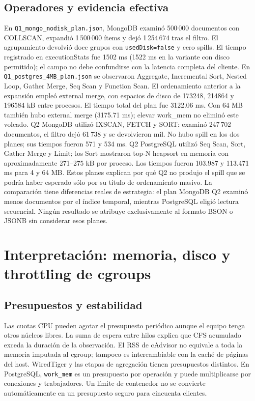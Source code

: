 \documentclass[11pt,letterpaper]{article}
\begin{document}
\subsection{Operadores y evidencia efectiva}
En \texttt{Q1\_mongo\_nodisk\_plan.json}, MongoDB examinó 500\,000 documentos con COLLSCAN, expandió 1\,500\,000 ítems y dejó 1\,254\,674 tras el filtro. El agrupamiento devolvió doce grupos con \texttt{usedDisk=false} y cero spills. El tiempo registrado en executionStats fue 1502 ms (1522 ms en la variante con disco permitido); el campo no debe confundirse con la latencia completa del cliente.
En \texttt{Q1\_postgres\_4MB\_plan.json} se observaron Aggregate, Incremental Sort, Nested Loop, Gather Merge, Seq Scan y Function Scan. El ordenamiento anterior a la expansión empleó external merge, con espacios de disco de 173248, 214864 y 196584 kB entre procesos. El tiempo total del plan fue 3122.06 ms. Con 64 MB también hubo external merge (3175.71 ms); elevar work\_mem no eliminó este volcado.
Q2 MongoDB utilizó IXSCAN, FETCH y SORT: examinó 247\,702 documentos, el filtro dejó 61\,738 y se devolvieron mil. No hubo spill en los dos planes; sus tiempos fueron 571 y 534 ms. Q2 PostgreSQL utilizó Seq Scan, Sort, Gather Merge y Limit; los Sort mostraron top-N heapsort en memoria con aproximadamente 271--275 kB por proceso. Los tiempos fueron 103.987 y 113.471 ms para 4 y 64 MB. Estos planes explican por qué Q2 no produjo el spill que se podría haber esperado sólo por su título de ordenamiento masivo.
La comparación tiene diferencias reales de estrategia: el plan MongoDB Q2 examinó menos documentos por el índice temporal, mientras PostgreSQL eligió lectura secuencial. Ningún resultado se atribuye exclusivamente al formato BSON o JSONB sin considerar esos planes.
\section{Interpretación: memoria, disco y throttling de cgroups}
\subsection{Presupuestos y estabilidad}
Las cuotas CPU pueden agotar el presupuesto periódico aunque el equipo tenga otros núcleos libres. La suma de espera entre hilos explica que CFS acumulado exceda la duración de la observación. El RSS de cAdvisor no equivale a toda la memoria imputada al cgroup; tampoco es intercambiable con la caché de páginas del host.
WiredTiger y las etapas de agregación tienen presupuestos distintos. En PostgreSQL, \texttt{work\_mem} es un presupuesto por operación y puede multiplicarse por conexiones y trabajadores. Un límite de contenedor no se convierte automáticamente en un presupuesto seguro para cincuenta clientes.
\end{document}
